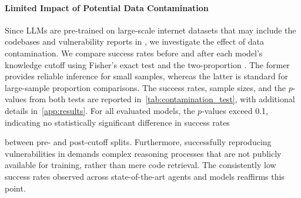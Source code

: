 \paragraph{Limited Impact of Potential Data Contamination}
Since LLMs are pre-trained on large-scale internet datasets that may include the codebases and vulnerability reports in \sysname, we investigate the effect of data contamination.
We compare success rates before and after each model’s knowledge cutoff using Fisher’s exact test and the two-proportion \ztest.
The former provides reliable inference for small samples, whereas the latter is standard for large-sample proportion comparisons.
The success rates, sample sizes, and the $p$-values from both tests are reported in~\cref{tab:contamination_test}, with additional details in~\cref{app:results}.
For all evaluated models, the $p$-values exceed 0.1, indicating no statistically significant difference in success rates
\begin{table}
\centering
\vspace{-3.3mm}
\caption{}
\vspace{-2.3mm}
\label{tab:contamination_test}
\end{table}
between pre- and post-cutoff splits.
Furthermore, successfully reproducing vulnerabilities in \sysname demands complex reasoning processes that are not publicly available for training, rather than mere code retrieval.
The consistently low success rates observed across state-of-the-art agents and models reaffirms this point.


